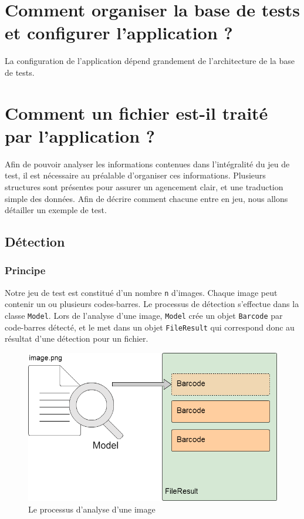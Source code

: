\chapter{Comment organiser la base de tests et configurer l'application ?}
\label{configFile}
La configuration de l'application dépend grandement de l'architecture de la base de tests.













\chapter{Comment un fichier est-il traité par l'application ?}

Afin de pouvoir analyser les informations contenues dans l'intégralité du jeu de test, il est nécessaire au préalable d'organiser ces informations. Plusieurs structures sont présentes pour assurer un agencement clair, et une traduction simple des données. Afin de décrire comment chacune entre en jeu, nous allons détailler un exemple de test.

\section{Détection}

\subsection{Principe}

Notre jeu de test est constitué d'un nombre \verb|n| d'images. Chaque image peut contenir un ou plusieurs codes-barres. Le processus de détection s'effectue dans la classe \verb|Model|. Lors de l'analyse d'une image, \verb|Model| crée un objet \verb|Barcode| par code-barres détecté, et le met dans un objet \verb|FileResult| qui correspond donc au résultat d'une détection pour un fichier.

\begin{figure}
\begin{center}
\includegraphics[scale=0.3]{images/projet1Detection.png}
\caption{Le processus d'analyse d'une image}
\end{center}
\end{figure}


